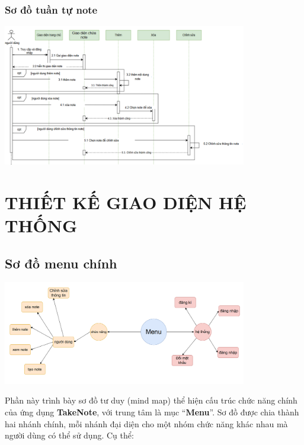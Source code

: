 \documentclass[a4paper,12pt]{article}
\begin{document}
\subsubsection{Sơ đồ tuần tự note}
\includegraphics[width=0.8\textwidth]{SDtuantu.png}

\clearpage
\section{THIẾT KẾ GIAO DIỆN HỆ THỐNG}
\subsection{Sơ đồ menu chính}
\begin{center}
\includegraphics[width=0.8\textwidth]{SDmenuchinh.png}
\end{center}
Phần này trình bày sơ đồ tư duy (mind map) thể hiện cấu trúc chức năng chính của ứng dụng \textbf{TakeNote}, với trung tâm là mục ``\textbf{Menu}''. Sơ đồ được chia thành hai nhánh chính, mỗi nhánh đại diện cho một nhóm chức năng khác nhau mà người dùng có thể sử dụng. Cụ thể:
\end{document}
